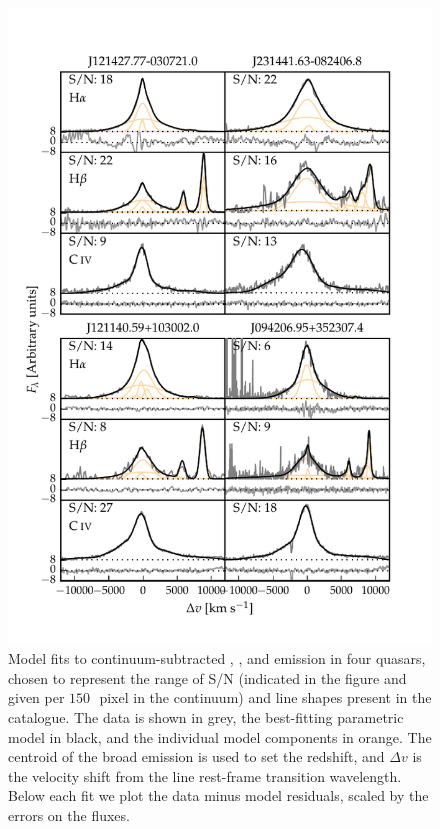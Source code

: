 \begin{figure}
    \centering
    \includegraphics[width=\linewidth]{figures/chapter03/example_spectrum_grid.pdf} 
    \caption[{Model fits to continuum-subtracted \hans, \hbns, and  emission in four quasars, chosen to represent the range of S/N and line shapes present in the catalogue.}]{Model fits to continuum-subtracted \hans, \hbns, and  emission in four quasars, chosen to represent the range of S/N (indicated in the figure and given per $150$\,\kms\, pixel in the continuum) and line shapes present in the catalogue. The data is shown in grey, the best-fitting parametric model in black, and the individual model components in orange. The centroid of the broad \ha emission is used to set the redshift, and $\Delta{v}$ is the velocity shift from the line rest-frame transition wavelength. Below each fit we plot the data minus model residuals, scaled by the errors on the fluxes.} 
    \label{fig:examplegrid}
\end{figure}


